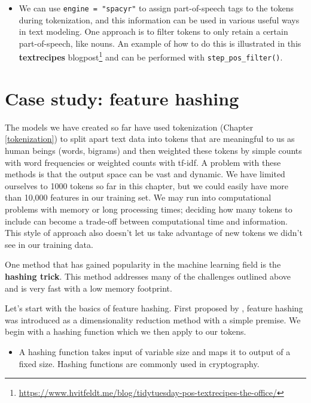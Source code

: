 \documentclass[
]{krantz}
\DeclareRobustCommand{\href}[2]{#2\footnote{\url{#1}}}
\renewcommand{\href}[2]{#2\footnote{\url{#1}}}
\newenvironment{rmdblock}[1]
  {\begin{shaded*}
  \begin{itemize}[left = -1cm, labelsep = 1cm]
  \renewcommand{\labelitemi}{
    \raisebox{-.7\height}[0pt][0pt]{
      {\setkeys{Gin}{width=3em,keepaspectratio}\texttt{[image: images/\#1]}}
    }
  }
 
  \item
  }
  {
  \end{itemize}
  \end{shaded*}
  }
\newenvironment{rmdnote}
  {\begin{rmdblock}{note}}
  {\end{rmdblock}}
\newenvironment{rmdwarning}
  {\begin{rmdblock}{warning}}
  {\end{rmdblock}}
\begin{document}
\begin{rmdnote}
We can use \texttt{engine\ =\ "spacyr"} to assign part-of-speech tags to
the tokens during tokenization, and this information can be used in
various useful ways in text modeling. One approach is to filter tokens
to only retain a certain part-of-speech, like nouns. An example of how
to do this is illustrated in this
\href{https://www.hvitfeldt.me/blog/tidytuesday-pos-textrecipes-the-office/}{\textbf{textrecipes}
blogpost} and can be performed with \texttt{step\_pos\_filter()}.
\end{rmdnote}


\hypertarget{case-study-feature-hashing}{%
\section{Case study: feature hashing}\label{case-study-feature-hashing}}

The models we have created so far have used tokenization (Chapter \ref{tokenization}) to split apart text data into tokens that are meaningful to us as human beings (words, bigrams) and then weighted these tokens by simple counts with word frequencies or weighted counts with tf-idf.
A problem with these methods is that the output space can be vast and dynamic.
We have limited ourselves to 1000 tokens so far in this chapter, but we could easily have more than 10,000 features in our training set.
We may run into computational problems with memory or long processing times; deciding how many tokens to include can become a trade-off between computational time and information.
This style of approach also doesn't let us take advantage of new tokens we didn't see in our training data.

One method that has gained popularity in the machine learning field is the \textbf{hashing trick}.
This method addresses many of the challenges outlined above and is very fast with a low memory footprint.

Let's start with the basics of feature hashing.
First proposed by \citet{Weinberger2009}, feature hashing was introduced as a dimensionality reduction method with a simple premise.
We begin with a hashing function which we then apply to our tokens.

\begin{rmdwarning}
A hashing function takes input of variable size and maps it to output of
a fixed size. Hashing functions are commonly used in cryptography.
\end{rmdwarning}
\end{document}
